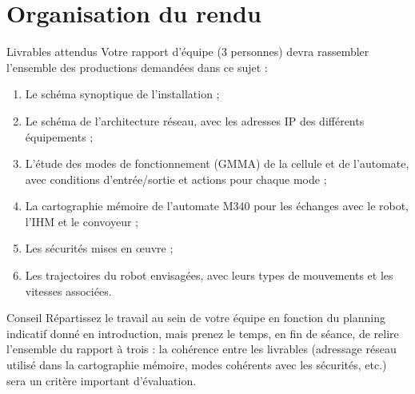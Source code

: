 \section{Organisation du rendu}

\begin{UPSTIinfor}{Livrables attendus}
Votre rapport d'équipe (3 personnes) devra rassembler l'ensemble des
productions demandées dans ce sujet :
\begin{enumerate}
    \item Le schéma synoptique de l'installation ;
    \item Le schéma de l'architecture réseau, avec les adresses IP des
    différents équipements ;
    \item L'étude des modes de fonctionnement (GMMA) de la cellule et de
    l'automate, avec conditions d'entrée/sortie et actions pour chaque
    mode ;
    \item La cartographie mémoire de l'automate M340 pour les échanges avec
    le robot, l'IHM et le convoyeur ;
    \item Les sécurités mises en œuvre ;
    \item Les trajectoires du robot envisagées, avec leurs types de
    mouvements et les vitesses associées.
\end{enumerate}
\end{UPSTIinfor}

\begin{UPSTIidee}{Conseil}
Répartissez le travail au sein de votre équipe en fonction du planning
indicatif donné en introduction, mais prenez le temps, en fin de séance, de
relire l'ensemble du rapport à trois : la cohérence entre les livrables
(adressage réseau utilisé dans la cartographie mémoire, modes cohérents avec
les sécurités, etc.) sera un critère important d'évaluation.
\end{UPSTIidee}

